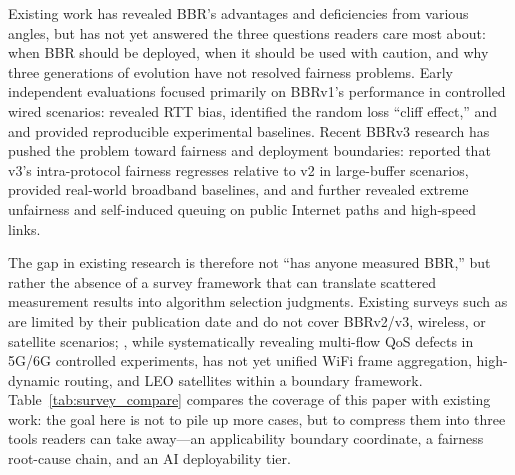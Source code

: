 \documentclass[a4paper,fleqn]{cas-sc}
\begin{document}
Existing work has revealed BBR's advantages and deficiencies from various angles,
but has not yet answered the three questions readers care most about: when BBR
should be deployed, when it should be used with caution, and why three generations
of evolution have not resolved fairness problems. Early independent evaluations
focused primarily on BBRv1's performance in controlled wired scenarios:
\citet{hock2017bbr} revealed RTT bias, \citet{cao2019bbr} identified the random
loss ``cliff effect,'' and \citet{jaeger2019bbr} and \citet{scholz2018deeper}
provided reproducible experimental baselines. Recent BBRv3 research has pushed
the problem toward fairness and deployment boundaries: \citet{piotrowska2024}
reported that v3's intra-protocol fairness regresses relative to v2 in
large-buffer scenarios, \citet{gomez2024bbrv3} provided real-world broadband
baselines, and \citet{zeynali2024bbrv3} and \citet{bless2025insights} further
revealed extreme unfairness and self-induced queuing on public Internet paths and
high-speed links.

The gap in existing research is therefore not ``has anyone measured BBR,'' but
rather the absence of a survey framework that can translate scattered measurement
results into algorithm selection judgments. Existing surveys such as
\citet{al2019survey} are limited by their publication date and do not cover
BBRv2/v3, wireless, or satellite scenarios; \citet{abrol2026bbr}, while
systematically revealing multi-flow QoS defects in 5G/6G controlled experiments,
has not yet unified WiFi frame aggregation, high-dynamic routing, and LEO
satellites within a boundary framework. Table~\ref{tab:survey_compare} compares
the coverage of this paper with existing work: the goal here is not to pile up
more cases, but to compress them into three tools readers can take away---an
applicability boundary coordinate, a fairness root-cause chain, and an
AI deployability tier.
\end{document}
